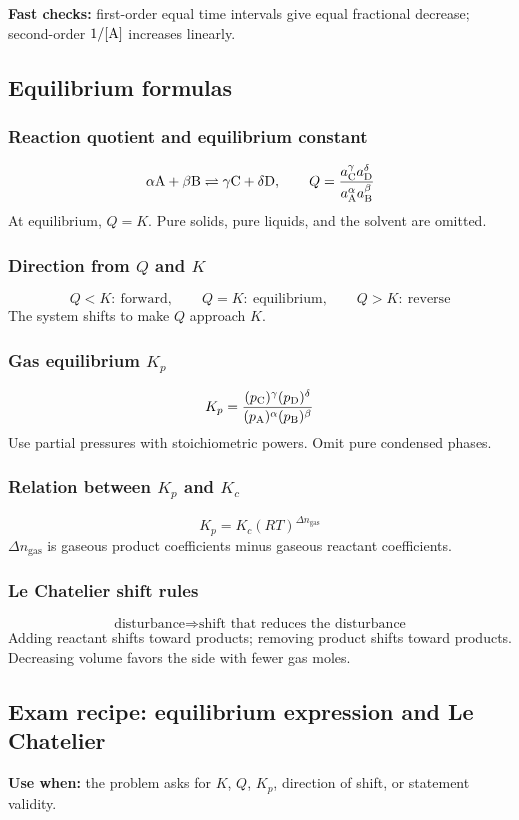 \textbf{Fast checks:} first-order equal time intervals give equal fractional decrease; second-order \(1/[\ce{A}]\) increases linearly.

\subsection{Equilibrium formulas}

\subsubsection{Reaction quotient and equilibrium constant}
\[
\alpha\ce{A}+\beta\ce{B}\rightleftharpoons\gamma\ce{C}+\delta\ce{D}, \qquad
Q=\frac{a_{\ce{C}}^\gamma a_{\ce{D}}^\delta}{a_{\ce{A}}^\alpha a_{\ce{B}}^\beta}
\]
At equilibrium, \(Q=K\). Pure solids, pure liquids, and the solvent are omitted.

\subsubsection{Direction from \(Q\) and \(K\)}
\[
Q<K:\ \text{forward}, \qquad Q=K:\ \text{equilibrium}, \qquad Q>K:\ \text{reverse}
\]
The system shifts to make \(Q\) approach \(K\).

\subsubsection{Gas equilibrium \(K_p\)}
\[
K_p=\frac{(p_{\ce{C}})^\gamma(p_{\ce{D}})^\delta}{(p_{\ce{A}})^\alpha(p_{\ce{B}})^\beta}
\]
Use partial pressures with stoichiometric powers. Omit pure condensed phases.

\subsubsection{Relation between \(K_p\) and \(K_c\)}
\[
K_p=K_c(RT)^{\Delta n_{\mathrm{gas}}}
\]
\(\Delta n_{\mathrm{gas}}\) is gaseous product coefficients minus gaseous reactant coefficients.

\subsubsection{Le Chatelier shift rules}
\[
\text{disturbance}\Rightarrow\text{shift that reduces the disturbance}
\]
Adding reactant shifts toward products; removing product shifts toward products. Decreasing volume favors the side with fewer gas moles.

\subsection{Exam recipe: equilibrium expression and Le Chatelier}
\textbf{Use when:} the problem asks for \(K\), \(Q\), \(K_p\), direction of shift, or statement validity.

